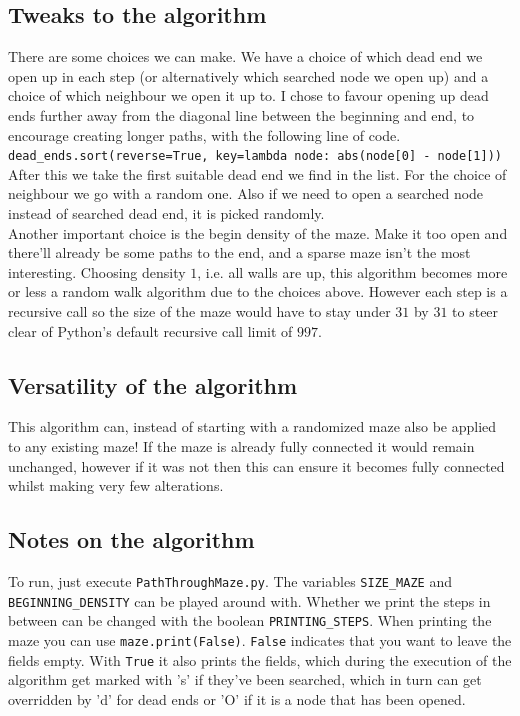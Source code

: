 \documentclass[10pt, a4paper, twoside]{amsart}
\newcommand{\1}{\mathbbm{1}}
\begin{document}
\subsection{Tweaks to the algorithm}
There are some choices we can make.
We have a choice of which dead end we open up in each step (or alternatively which searched node we open up) and a choice of which neighbour we open it up to.
I chose to favour opening up dead ends further away from the diagonal line between the beginning and end, to encourage creating longer paths, with the following line of code.\\
\verb+dead_ends.sort(reverse=True, key=lambda node: abs(node[0] - node[1]))+\\
After this we take the first suitable dead end we find in the list. For the choice of neighbour we go with a random one. Also if we need to open a searched node instead of searched dead end, it is picked randomly.\\

Another important choice is the begin density of the maze. Make it too open and there'll already be some paths to the end, and a sparse maze isn't the most interesting. Choosing density $1$, i.e. all walls are up, this algorithm becomes more or less a random walk algorithm due to the choices above. However each step is a recursive call so the size of the maze would have to stay under $31$ by $31$ to steer clear of Python's default recursive call limit of $997$.


\subsection{Versatility of the algorithm}
This algorithm can, instead of starting with a randomized maze also be applied to any existing maze! If the maze is already fully connected it would remain unchanged, however if it was not then this can ensure it becomes fully connected whilst making very few alterations.\\

\subsection{Notes on the algorithm}
To run, just execute \verb+PathThroughMaze.py+. The variables \verb+SIZE_MAZE+ and \verb+BEGINNING_DENSITY+ can be played around with. Whether we print the steps in between can be changed with the boolean \verb+PRINTING_STEPS+. When printing the maze you can use \verb+maze.print(False)+. \verb+False+ indicates that you want to leave the fields empty. With \verb+True+ it also prints the fields, which during the execution of the algorithm get marked with 's' if they've been searched, which in turn can get overridden by 'd' for dead ends or 'O' if it is a node that has been opened.\\
\end{document}
